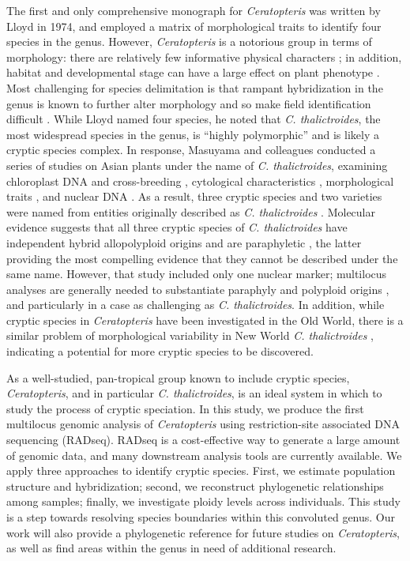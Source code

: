 \documentclass[12pt]{article}
\begin{document}
\begin{flushleft}
The first and only comprehensive monograph for \textit{Ceratopteris} was written by Lloyd in 1974, and employed a matrix of morphological traits to identify four species in the genus\nocite{LloydTax1974}. However, \textit{Ceratopteris} is a notorious group in terms of morphology: there are relatively few informative physical characters \autocite{LloydTax1974}; in addition, habitat and developmental stage can have a large effect on plant phenotype \autocite{Masuyama1992}. Most challenging for species delimitation is that rampant hybridization in the genus is known to further alter morphology and so make field identification difficult \autocite{hickok1974, LloydTax1974, Masuyama2010}. While Lloyd named four species, he noted that \textit{C. thalictroides}, the most widespread species in the genus, is ``highly polymorphic'' \autocite{LloydTax1974} and is likely a cryptic species complex. In response, Masuyama and colleagues conducted a series of studies on Asian plants under the name of \textit{C. thalictroides}, examining chloroplast DNA and cross-breeding \autocite{Masuyama2002}, cytological characteristics \autocite{Masuyama2005}, morphological traits \autocite{Masuyama1992, Masuyama2008}, and nuclear DNA \autocite{Adjie2007}. As a result, three cryptic species and two varieties were named from entities originally described as \textit{C. thalictroides} \autocite{Masuyama2010}. Molecular evidence suggests that all three cryptic species of \textit{C. thalictroides} have independent hybrid allopolyploid origins and are paraphyletic \autocite{Adjie2007}, the latter providing the most compelling evidence that they cannot be described under the same name. However, that study included only one nuclear marker; multilocus analyses are generally needed to substantiate paraphyly and polyploid origins \autocite{Eaton2013, Jorgensen2017}, and particularly in a case as challenging as \textit{C. thalictroides}. In addition, while cryptic species in \textit{Ceratopteris} have been investigated in the Old World, there is a similar problem of morphological variability in New World \textit{C. thalictroides} \autocite{Masuyama2010, LloydTax1974}, indicating a potential for more cryptic species to be discovered.

As a well-studied, pan-tropical group known to include cryptic species, \textit{Ceratopteris}, and in particular \textit{C. thalictroides}, is an ideal system in which to study the process of cryptic speciation. In this study, we produce the first multilocus genomic analysis of \textit{Ceratopteris} using restriction-site associated DNA sequencing (RADseq). RADseq is a cost-effective way to generate a large amount of genomic data, and many downstream analysis tools are currently available. We apply three approaches to identify cryptic species. First, we estimate population structure and hybridization; second, we reconstruct phylogenetic relationships among samples; finally, we investigate ploidy levels across individuals. This study is a step towards resolving species boundaries within this convoluted genus. Our work will also provide a phylogenetic reference for future studies on \textit{Ceratopteris}, as well as find areas within the genus in need of additional research.


\end{flushleft}
\end{document}
